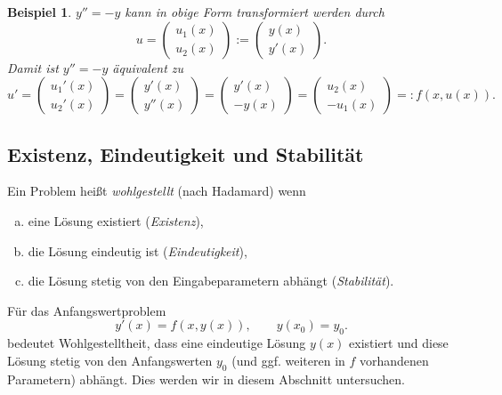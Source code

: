 \documentclass[12pt,a4paper]{book}
\theoremstyle{break}
\newtheorem{beispiel}[theorem]{Beispiel}
\theoremstyle{nonumberplain}
\newcommand{\1}{\mathbbm{1}} 			      	%
\begin{document}
\begin{beispiel}
$y''=-y$ kann in obige Form transformiert werden durch
\[
u=\left( \begin{array}{c} u_1(x)\\ u_2(x) \end{array}\right) := \left( \begin{array}{c} y(x)\\ y'(x) \end{array}\right).
\]
Damit ist $y''=-y$ äquivalent zu
\[
u'=\left( \begin{array}{c} u_1'(x)\\ u_2'(x) \end{array}\right)
= \left( \begin{array}{c} y'(x)\\ y''(x) \end{array}\right)
= \left( \begin{array}{c} y'(x)\\ -y(x) \end{array}\right)
= \left( \begin{array}{c} u_2(x)\\ -u_1(x) \end{array}\right)
=:f(x,u(x)).
\]
\end{beispiel}

\subsection{Existenz, Eindeutigkeit und Stabilität}\label{subsec:wohlgestellt}

Ein Problem heißt \emph{wohlgestellt} (nach Hadamard) wenn
\begin{enumerate}[(a)]
\item eine Lösung existiert (\emph{Existenz}),
\item die Lösung eindeutig ist (\emph{Eindeutigkeit}),
\item die Lösung stetig von den Eingabeparametern abhängt (\emph{Stabilität}).
\end{enumerate}

Für das Anfangswertproblem 
\[
y'(x)=f(x,y(x)), \qquad y(x_0)=y_0.
\]
bedeutet Wohlgestelltheit, dass eine eindeutige Lösung $y(x)$ existiert und diese Lösung 
stetig von den Anfangswerten $y_0$ (und ggf. weiteren in $f$ vorhandenen Parametern) abhängt.
Dies werden wir in diesem Abschnitt untersuchen.
\end{document}
